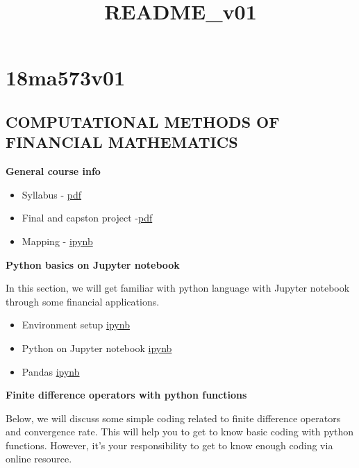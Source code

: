 \documentclass[11pt]{article}
\title{README\_v01}
\providecommand{\tightlist}{%
      \setlength{\itemsep}{0pt}\setlength{\parskip}{0pt}}
\begin{document}
    
    
    \maketitle
    
    

    
    \section{18ma573v01}\label{ma573v01}

\subsection{COMPUTATIONAL METHODS OF FINANCIAL
MATHEMATICS}\label{computational-methods-of-financial-mathematics}

\textbf{General course info}

\begin{itemize}
\tightlist
\item
  Syllabus - \href{doc/syllabus_v01.pdf}{pdf}
\item
  Final and capston project -\href{./doc/capstone.pdf}{pdf}
\item
  Mapping - \href{src/mapping.ipynb}{ipynb}
\end{itemize}

    \textbf{Python basics on Jupyter notebook}

In this section, we will get familiar with python language with Jupyter
notebook through some financial applications.

\begin{itemize}
\tightlist
\item
  Environment setup
  \href{https://github.com/songqsh/18ma573pub/blob/master/src/first_notebook_v01.ipynb}{ipynb}
\item
  Python on Jupyter notebook \href{src/python_notebook.ipynb}{ipynb}
\item
  Pandas \href{src/pandas_basics.ipynb}{ipynb}
\end{itemize}

\textbf{Finite difference operators with python functions}

Below, we will discuss some simple coding related to finite difference
operators and convergence rate. This will help you to get to know basic
coding with python functions. However, it's your responsibility to get
to know enough coding via online resource.
\end{document}
